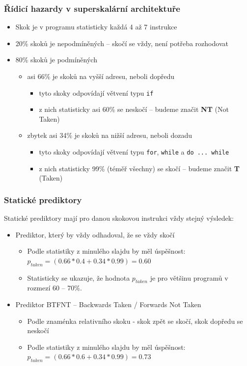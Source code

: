 \documentclass{beamer}
\begin{document}
\begin{frame}
\frametitle{Řídicí hazardy v superskalární architektuře}

\begin{itemize}
\item Skok je v programu statisticky každá 4 až 7 instrukce
\item 20\% skoků je nepodmíněných -- skočí se vždy, není potřeba rozhodovat
\item 80\% skoků je podmíněných
  \begin{itemize}
  \item asi 66\% je skoků na vyšší adresu, neboli dopředu 
    \begin{itemize}
    \item tyto skoky odpovídají větvení typu \texttt{if} 
    \item z nich statisticky asi 60\% se neskočí -- budeme značit \textbf{NT} (Not Taken)
    \end{itemize}
  \item zbytek asi 34\% je skoků na nižší adresu, neboli dozadu 
    \begin{itemize}
    \item tyto skoky odpovídají větvení typu \texttt{for}, \texttt{while} a \texttt{do ... while}
    \item z nich statisticky 99\% (téměř všechny) se skočí -- budeme značit \textbf{T} (Taken)
    \end{itemize}
  \end{itemize}
\end{itemize}

\end{frame}


\begin{frame}
\frametitle{Statické prediktory}

Statické prediktory mají pro danou skokovou instrukci vždy stejný výsledek:
\begin{itemize}
\item Prediktor, který by vždy odhadoval, že se vždy skočí 
\begin{itemize}
\item Podle statistiky z minulého slajdu by měl úspěšnost: $p_{taken} = (0.66*0.4+0.34*0.99) = 0.60$
\item Statisticky se ukazuje, že hodnota $p_{taken}$ je pro většinu programů v rozmezí 60 -- 70\%.
\end{itemize}
\item Prediktor BTFNT -- Backwards Taken / Forwards Not Taken  
\begin{itemize}
\item Podle znaménka relativního skoku - skok zpět se skočí, skok dopředu se neskočí
\item Podle statistiky z minulého slajdu by měl úspěšnost: $p_{taken} = (0.66*0.6+0.34*0.99) = 0.73$
\end{itemize}
\end{itemize}

\end{frame}
\end{document}
